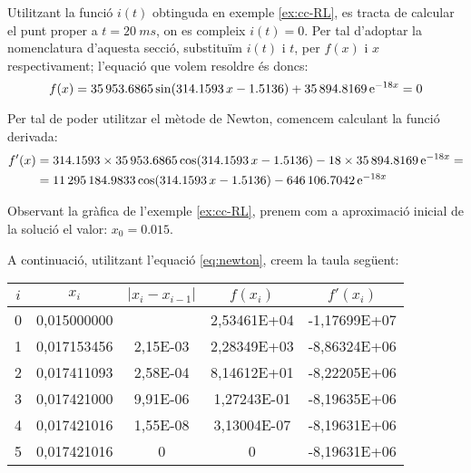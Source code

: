 \begin{exemple}
    Utilitzant la funció $i(t)$ obtinguda en exemple \vref{ex:cc-RL}, es tracta de calcular el punt proper a $t = \SI{20}{ms}$, on es compleix $i(t)=0$. Per tal d'adoptar la nomenclatura d'aquesta secció, substituïm $i(t)$ i $t$, per $f(x)$ i $x$ respectivament; l'equació que volem resoldre és doncs:
    \[
        f(x) = \num{35953,6865}\sin(\num{314,1593}\,x-\num{1,5136}) + \num{35894,8169}\,\mathrm{e}^{-18 x} = 0
    \]

    Per tal de poder utilitzar el mètode de Newton, comencem calculant la funció derivada:
    \begin{align*}
        f'(x) &= \num{314,1593}\times\num{35953,6865}\cos(\num{314,1593}\,x-\num{1,5136}) -18\times \num{35894,8169}\,\mathrm{e}^{-18 x}= \\
        {} &= \num{11295184,9833}\cos(\num{314,1593}\,x-\num{1,5136}) - \num{646106,7042}\,\mathrm{e}^{-18 x}
    \end{align*}

    Observant la gràfica de l'exemple \vref{ex:cc-RL}, prenem com a  aproximació inicial de la solució el valor: $x_0 = \num{0,015}$.

    A continuació, utilitzant l'equació \eqref{eq:newton}, creem la taula següent:

\begin{center}
   \centering
   \begin{tabular}{S[table-format=1.0]S[table-format=2.9]S[table-format=2.2e+2]
   S[table-format=2.5e+2]S[table-format=+3.5e+2]}
    & {$x_i$}  & {$|x_i - x_{i-1}|$} & {$f(x_i)$} & {$f'(x_i)$} \\
    &	0,015000000 &	{}       & 2,53461E+04	& -1,17699E+07 \\
        1 &	0,017153456 &	2,15E-03 & 2,28349E+03	& -8,86324E+06 \\	
        2 &	0,017411093 &	2,58E-04 & 8,14612E+01	& -8,22205E+06 \\	
        3 &	0,017421000 &	9,91E-06 & 1,27243E-01	& -8,19635E+06 \\	
        4 &	0,017421016 &	1,55E-08 & 3,13004E-07	& -8,19631E+06 \\	
        5 &	0,017421016 &	0        & 0           	& -8,19631E+06 \\	
   \bottomrule[1pt]
   \end{tabular}
\end{center}


\end{exemple}
